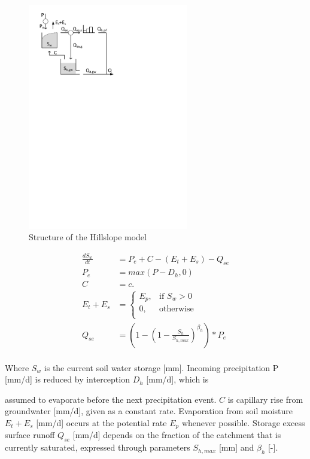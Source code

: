 { 																	%
\begin{figure}
\includegraphics[trim=1cm 20.3cm 9cm 1cm,width=7cm,keepaspectratio]{./files/13_schematic.pdf}
\caption{Structure of the Hillslope model} \label{fig:13_schematic}
\end{figure}

\begin{align}
	\frac{dS_w}{dt} &= P_e+C-(E_t+E_s)-Q_{se} \\
	P_e &= max(P-D_h,0)\\
	C &= c.\\
	E_t+E_s &= 
	\begin{cases}
		E_p, & \text{if } S_w > 0 \\
		0, & \text{otherwise}\\
	\end{cases}\\
	Q_{se} &= \left(1-\left(1-\frac{S_h}{S_{h,max}}\right)^{\beta_h}\right)*P_e\\
\end{align}

Where $S_w$ is the current soil water storage [mm]. Incoming precipitation P [mm/d] is reduced by interception $D_h$ [mm/d], which is 

} %

assumed to evaporate before the next precipitation event. $C$ is capillary rise from groundwater [mm/d], given as a constant rate. Evaporation from soil moisture $E_t+E_s$ [mm/d] occurs at the potential rate $E_p$ whenever possible. Storage excess surface runoff $Q_{se}$ [mm/d] depends on the fraction of the catchment that is currently saturated, expressed through parameters $S_{h,max}$ [mm] and $\beta_h$ [-]. 

